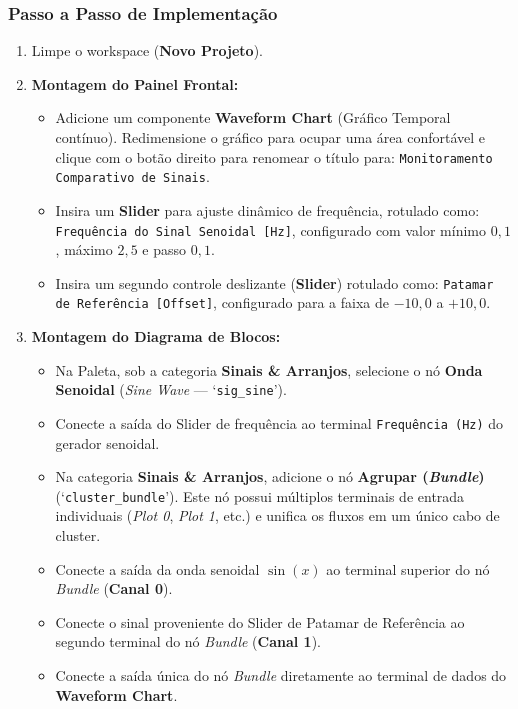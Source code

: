 \documentclass[11pt,a4paper]{article}
\begin{document}
\subsubsection{Passo a Passo de Implementação}
\begin{enumerate}
    \item Limpe o workspace (\textbf{Novo Projeto}).
    \item \textbf{Montagem do Painel Frontal:}
    \begin{itemize}
        \item Adicione um componente \textbf{Waveform Chart} (Gráfico Temporal contínuo). Redimensione o gráfico para ocupar uma área confortável e clique com o botão direito para renomear o título para: \texttt{Monitoramento Comparativo de Sinais}.
        \item Insira um \textbf{Slider} para ajuste dinâmico de frequência, rotulado como: \texttt{Frequência do Sinal Senoidal [Hz]}, configurado com valor mínimo $0{,}1$, máximo $2{,}5$ e passo $0{,}1$.
        \item Insira um segundo controle deslizante (\textbf{Slider}) rotulado como: \texttt{Patamar de Referência [Offset]}, configurado para a faixa de $-10{,}0$ a $+10{,}0$.
    \end{itemize}
    \item \textbf{Montagem do Diagrama de Blocos:}
    \begin{itemize}
        \item Na Paleta, sob a categoria \textbf{Sinais \& Arranjos}, selecione o nó \textbf{Onda Senoidal} (\textit{Sine Wave} --- `\texttt{sig\_sine}').
        \item Conecte a saída do Slider de frequência ao terminal \texttt{Frequência (Hz)} do gerador senoidal.
        \item Na categoria \textbf{Sinais \& Arranjos}, adicione o nó \textbf{Agrupar (\textit{Bundle})} (`\texttt{cluster\_bundle}'). Este nó possui múltiplos terminais de entrada individuais (\textit{Plot 0}, \textit{Plot 1}, etc.) e unifica os fluxos em um único cabo de cluster.
        \item Conecte a saída da onda senoidal $\sin(x)$ ao terminal superior do nó \textit{Bundle} (\textbf{Canal 0}).
        \item Conecte o sinal proveniente do Slider de Patamar de Referência ao segundo terminal do nó \textit{Bundle} (\textbf{Canal 1}).
        \item Conecte a saída única do nó \textit{Bundle} diretamente ao terminal de dados do \textbf{Waveform Chart}.

\end{itemize}
\end{enumerate}
\end{document}

